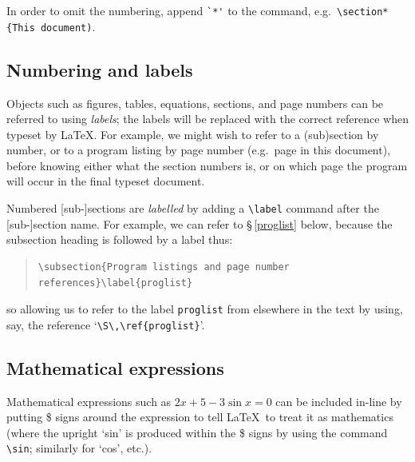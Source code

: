 In order to omit the numbering, append \verb|`*'| to the command,
e.g.\ \verb|\section*{This document)|.

\subsection{Numbering and labels}

Objects such as figures, tables, equations, sections, and page numbers
can be referred to using \textit{labels}; the labels will be replaced
with the correct reference when typeset by \LaTeX.  For example, we
might wish to refer to a (sub)section by number, or to a program
listing by page number (e.g.\ page \pageref{question:2:program} in
this document), before knowing either what the section numbers is, or
on which page the program will occur in the final typeset document.

Numbered [sub-]sections are \textit{labelled} by adding a \verb!\label!
command after the [sub-]section name. For example, we can refer to
\S\,\ref{proglist} below, because the subsection heading is followed
by a label thus:
\begin{quote}
\begin{verbatim}
\subsection{Program listings and page number references}\label{proglist}
\end{verbatim}
\end{quote}
so allowing us to refer to the label \verb|proglist| from elsewhere in
the text by using, say, the reference `\verb|\S\,\ref{proglist}|'.

\subsection{Mathematical expressions}

Mathematical expressions such as $2x+5-3\sin x=0$ can be included
in-line by putting \$ signs around the expression to tell \LaTeX\ to
treat it as mathematics (where the upright `sin' is produced within
the \$ signs by using the command \verb|\sin|; similarly for `cos',
etc.).

